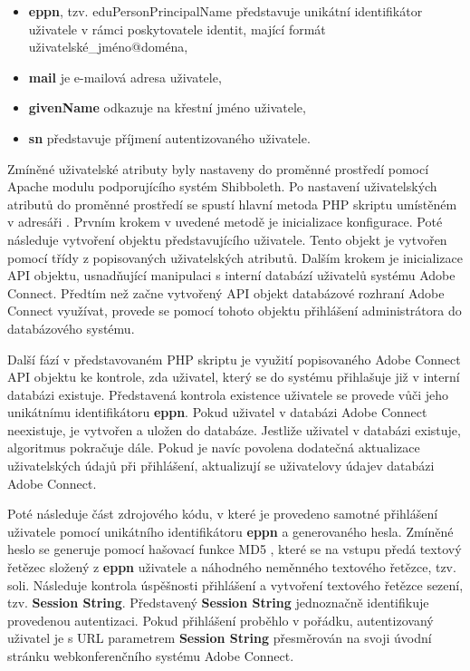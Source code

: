 \documentclass[
  printed, %
  twoside, %
  table,   %
  nolof,     %
  nolot,     %
]{fithesis3}
\begin{document}
\begin{itemize}
    \item \textbf{eppn}, tzv. eduPersonPrincipalName představuje unikátní identifikátor uživatele v rámci poskytovatele identit,  mající formát uživatelské\_jméno@doména,
    \item \textbf{mail} je e-mailová adresa uživatele, 
    \item \textbf{givenName} odkazuje na křestní jméno uživatele,
    \item \textbf{sn} představuje příjmení autentizovaného uživatele.
\end{itemize}
\label{item:adobe-connect}
Zmíněné uživatelské atributy byly nastaveny do proměnné prostředí pomocí Apache modulu podporujícího systém Shibboleth. Po nastavení uživatelských atributů do proměnné prostředí se spustí hlavní metoda  PHP skriptu  umístěném v adresáři . Prvním krokem v uvedené metodě je inicializace konfigurace. Poté následuje vytvoření objektu představujícího uživatele. Tento objekt je vytvořen pomocí třídy  z popisovaných uživatelských atributů. Dalším krokem je inicializace API objektu, usnadňující manipulaci s interní databází uživatelů systému Adobe Connect. Předtím než začne vytvořený API objekt databázové rozhraní Adobe Connect využívat, provede se pomocí tohoto objektu přihlášení administrátora do databázového systému. \par 

Další fází v představovaném PHP skriptu je využití popisovaného Adobe Connect API objektu ke kontrole, zda uživatel, který se do systému přihlašuje již v interní databázi existuje. Představená kontrola existence uživatele se provede vůči jeho unikátnímu identifikátoru \textbf{eppn}. Pokud uživatel v databázi Adobe Connect neexistuje, je vytvořen a uložen do databáze. Jestliže uživatel v databázi existuje, algoritmus pokračuje dále. Pokud je navíc povolena dodatečná aktualizace uživatelských údajů při přihlášení, aktualizují se uživatelovy údaje\break v databázi Adobe Connect. \par

Poté následuje část zdrojového kódu, v které je provedeno samotné přihlášení uživatele pomocí unikátního identifikátoru \textbf{eppn} a generovaného hesla. Zmíněné heslo se generuje pomocí hašovací funkce MD5 \cite{rfc1321}, které se na vstupu předá textový řetězec složený z \textbf{eppn} uživatele a náhodného neměnného textového řetězce, tzv. soli. Následuje kontrola úspěšnosti přihlášení a vytvoření textového řetězce sezení, tzv. \textbf{Session String}. Představený \textbf{Session String} jednoznačně identifikuje provedenou autentizaci. Pokud přihlášení proběhlo v pořádku, autentizovaný uživatel je s URL parametrem \textbf{Session String} přesměrován na svoji úvodní stránku webkonferenčního systému Adobe Connect.      
\end{document}
